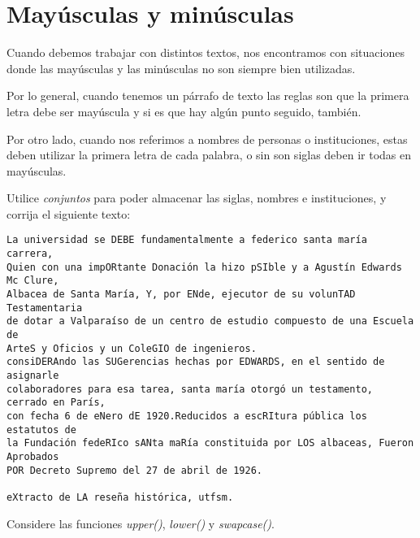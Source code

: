\section{Mayúsculas y minúsculas}

Cuando debemos trabajar con distintos textos, nos encontramos con
situaciones donde las mayúsculas y las minúsculas no son siempre bien
utilizadas.

Por lo general, cuando tenemos un párrafo de texto las reglas son que la
primera letra debe ser mayúscula y si es que hay algún punto seguido,
también.

Por otro lado, cuando nos referimos a nombres de personas o
instituciones, estas deben utilizar la primera letra de cada palabra, o
sin son siglas deben ir todas en mayúsculas.

Utilice \emph{conjuntos} para poder almacenar las siglas, nombres e
instituciones, y corrija el siguiente texto:

\begin{lstlisting}
La universidad se DEBE fundamentalmente a federico santa maría carrera,
Quien con una impORtante Donación la hizo pSIble y a Agustín Edwards Mc Clure,
Albacea de Santa María, Y, por ENde, ejecutor de su volunTAD Testamentaria
de dotar a Valparaíso de un centro de estudio compuesto de una Escuela de
ArteS y Oficios y un ColeGIO de ingenieros.
consiDERAndo las SUGerencias hechas por EDWARDS, en el sentido de asignarle
colaboradores para esa tarea, santa maría otorgó un testamento, cerrado en París,
con fecha 6 de eNero dE 1920.Reducidos a escRItura pública los estatutos de
la Fundación fedeRIco sANta maRía constituida por LOS albaceas, Fueron Aprobados
POR Decreto Supremo del 27 de abril de 1926.

eXtracto de LA reseña histórica, utfsm.
\end{lstlisting}

Considere las funciones \emph{upper()}, \emph{lower()} y
\emph{swapcase()}.
